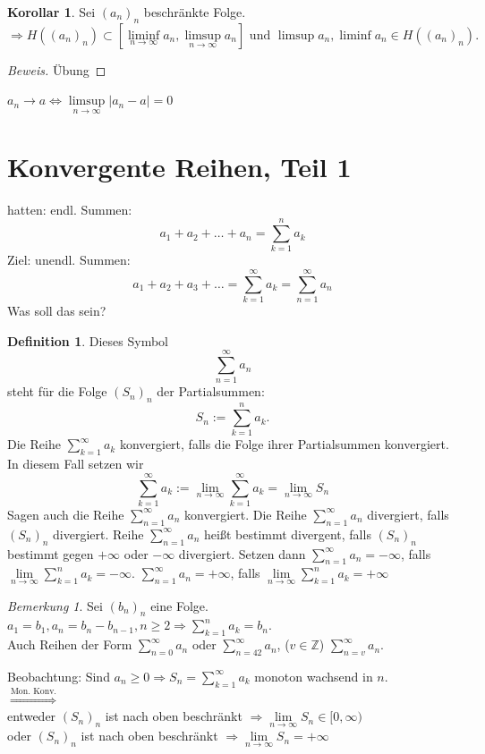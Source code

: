 \documentclass[12pt,a4paper,titlepage]{article} %
\theoremstyle{definition}
\newtheorem{kor}[satz]{Korollar}
\newtheorem{defi}[satz]{Definition}
\theoremstyle{remark}
\newtheorem*{bem}{Bemerkung}
\newenvironment{bew}{\begin{proof}[Beweis]}{\end{proof}}
\newcommand{\Z}{\mathbb{Z}}
\newcommand{\limes}[1]{\lim\limits_{#1\rightarrow\infty}}
\begin{document}
\begin{kor}
	Sei \((a_n)_n\) beschränkte Folge.
	\[ \Rightarrow H((a_n)_n) \subset [ \liminf\limits_{n\rightarrow\infty}a_n, \limsup\limits_{n\rightarrow\infty}a_n ] \text{ und } \limsup a_n, \liminf a_n \in H((a_n)_n). \]
\end{kor}
\begin{bew}
	Übung
\end{bew}
\(a_n \rightarrow a \Leftrightarrow \limsup\limits_{n\rightarrow\infty}|a_n - a| = 0 \)
\section{Konvergente Reihen, Teil 1}
hatten: endl. Summen: \[ a_1+a_2+\dots+a_n = \sum_{k=1}^{n}a_k \]
Ziel: unendl. Summen: \[ a_1+a_2+a_3+\dots = \sum_{k=1}^{\infty}a_k = \sum_{n=1}^{\infty}a_n \]
Was soll das sein?
\begin{defi}
	Dieses Symbol \[ \sum_{n=1}^{\infty}a_n \] steht für die Folge \((S_n)_n\) der Partialsummen: \[S_n := \sum_{k=1}^{n}a_k .\]
	Die Reihe \( \sum_{k=1}^{\infty}a_k \) konvergiert, falls die Folge ihrer Partialsummen konvergiert. In diesem Fall setzen wir 
	\[ \sum_{k=1}^{\infty}a_k := \limes{n} \sum_{k=1}^{\infty}a_k = \limes{n} S_n \]
	Sagen auch die Reihe \( \sum_{n=1}^{\infty}a_n \) konvergiert. Die Reihe \( \sum_{n=1}^{\infty}a_n \) divergiert, falls \( (S_n)_n \) divergiert. Reihe \( \sum_{n=1}^{\infty}a_n \) heißt bestimmt divergent, falls \((S_n)_n\) bestimmt gegen \(+ \infty \) oder \(-\infty\) divergiert. Setzen dann \( \sum_{n=1}^{\infty}a_n =-\infty \), falls \(\limes{n} \sum_{k=1}^{n}a_k = -\infty \). \( \sum_{n=1}^{\infty}a_n = +\infty \), falls \( \limes{n}\sum_{k=1}^{n}a_k=+\infty \)
\end{defi}
\begin{bem}
	Sei \((b_n)_n\) eine Folge. \(a_1 = b_1, a_n = b_n-b_{n-1}, n\geq 2 \Rightarrow \sum_{k=1}^{n}a_k = b_n \).\\
	Auch Reihen der Form \( \sum_{n=0}^{\infty}a_n \) oder \( \sum_{n=42}^{\infty}a_n\), (\(v\in\Z\)) \(\sum_{n=v}^{\infty}a_n\).
\end{bem}
Beobachtung: Sind \(a_n \geq 0 \Rightarrow S_n = \sum_{k=1}^{\infty}a_k \) monoton wachsend in \(n\).\\
\( \overset{\text{Mon. Konv.}}{\Rightarrow}\)\\
entweder \((S_n)_n\) ist nach oben beschränkt \( \Rightarrow \limes{n} S_n \in [0,\infty) \)\\
oder \((S_n)_n\) ist nach oben beschränkt \( \Rightarrow \limes{n} S_n  = +\infty \)\\
\end{document}
